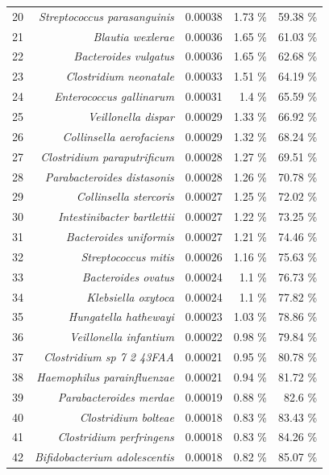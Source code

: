 \documentclass{article}
\begin{document}
\begin{table}[h]
\begin{centering}
\begin{tabular}{|r|r|r|r|r|}
      20 & \textit{Streptococcus parasanguinis} & 0.00038 & 1.73 \% & 59.38 \% \\
      21 & \textit{Blautia wexlerae} & 0.00036 & 1.65 \% & 61.03 \% \\
      22 & \textit{Bacteroides vulgatus} & 0.00036 & 1.65 \% & 62.68 \% \\
      23 & \textit{Clostridium neonatale} & 0.00033 & 1.51 \% & 64.19 \% \\
      24 & \textit{Enterococcus gallinarum} & 0.00031 & 1.4 \% & 65.59 \% \\
      25 & \textit{Veillonella dispar} & 0.00029 & 1.33 \% & 66.92 \% \\
      26 & \textit{Collinsella aerofaciens} & 0.00029 & 1.32 \% & 68.24 \% \\
      27 & \textit{Clostridium paraputrificum} & 0.00028 & 1.27 \% & 69.51 \% \\
      28 & \textit{Parabacteroides distasonis} & 0.00028 & 1.26 \% & 70.78 \% \\
      29 & \textit{Collinsella stercoris} & 0.00027 & 1.25 \% & 72.02 \% \\
      30 & \textit{Intestinibacter bartlettii} & 0.00027 & 1.22 \% & 73.25 \% \\
      31 & \textit{Bacteroides uniformis} & 0.00027 & 1.21 \% & 74.46 \% \\
      32 & \textit{Streptococcus mitis} & 0.00026 & 1.16 \% & 75.63 \% \\
      33 & \textit{Bacteroides ovatus} & 0.00024 & 1.1 \% & 76.73 \% \\
      34 & \textit{Klebsiella oxytoca} & 0.00024 & 1.1 \% & 77.82 \% \\
      35 & \textit{Hungatella hathewayi} & 0.00023 & 1.03 \% & 78.86 \% \\
      36 & \textit{Veillonella infantium} & 0.00022 & 0.98 \% & 79.84 \% \\
      37 & \textit{Clostridium sp 7 2 43FAA} & 0.00021 & 0.95 \% & 80.78 \% \\
      38 & \textit{Haemophilus parainfluenzae} & 0.00021 & 0.94 \% & 81.72 \% \\
      39 & \textit{Parabacteroides merdae} & 0.00019 & 0.88 \% & 82.6 \% \\
      40 & \textit{Clostridium bolteae} & 0.00018 & 0.83 \% & 83.43 \% \\
      41 & \textit{Clostridium perfringens} & 0.00018 & 0.83 \% & 84.26 \% \\
      42 & \textit{Bifidobacterium adolescentis} & 0.00018 & 0.82 \% & 85.07 \% \\

\end{tabular}
\end{centering}
\end{table}
\end{document}
